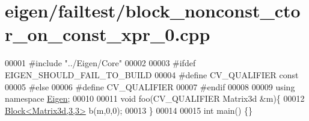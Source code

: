 \hypertarget{eigen_2failtest_2block__nonconst__ctor__on__const__xpr__0_8cpp_source}{}\section{eigen/failtest/block\+\_\+nonconst\+\_\+ctor\+\_\+on\+\_\+const\+\_\+xpr\+\_\+0.cpp}
\label{eigen_2failtest_2block__nonconst__ctor__on__const__xpr__0_8cpp_source}

\begin{DoxyCode}
00001 \textcolor{preprocessor}{#include "../Eigen/Core"}
00002 
00003 \textcolor{preprocessor}{#ifdef EIGEN\_SHOULD\_FAIL\_TO\_BUILD}
00004 \textcolor{preprocessor}{#define CV\_QUALIFIER const}
00005 \textcolor{preprocessor}{#else}
00006 \textcolor{preprocessor}{#define CV\_QUALIFIER}
00007 \textcolor{preprocessor}{#endif}
00008 
00009 \textcolor{keyword}{using namespace }\hyperlink{namespace_eigen}{Eigen};
00010 
00011 \textcolor{keywordtype}{void} foo(CV\_QUALIFIER Matrix3d &m)\{
00012     \hyperlink{group___core___module_class_eigen_1_1_block}{Block<Matrix3d,3,3>} b(m,0,0);
00013 \}
00014 
00015 \textcolor{keywordtype}{int} main() \{\}
\end{DoxyCode}
